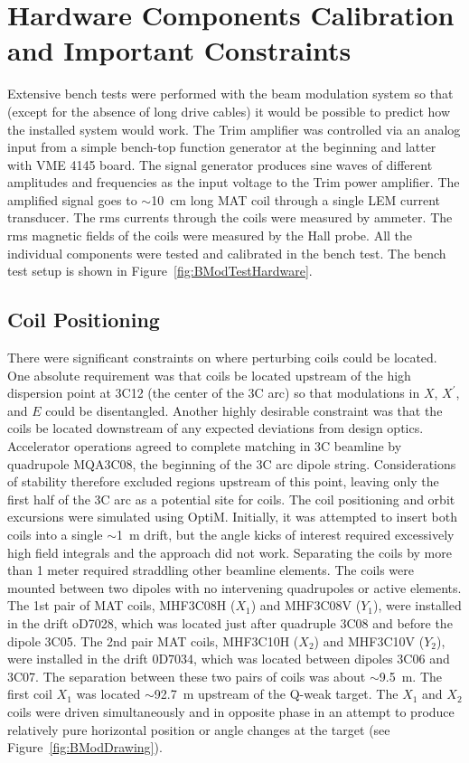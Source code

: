 \section{Hardware Components Calibration and Important Constraints}
\label{Hardware Components Calibration and Important Constraints}
Extensive bench tests were performed with the beam modulation system so that (except for the absence of long drive cables) it would be possible to predict how the installed system would work. The Trim amplifier was controlled via an analog input from a simple bench-top function generator at the beginning and latter with VME 4145 board. 
The signal generator produces sine waves of different amplitudes and frequencies as the input voltage to the Trim power amplifier. The amplified signal goes to $\sim$10~cm long MAT coil through a single LEM current transducer. The rms currents through the coils were measured by ammeter. The rms magnetic fields of the coils were measured by the Hall probe. All the individual components were tested and calibrated in the bench test. The bench test setup is shown in Figure~\ref{fig:BModTestHardware}.

\subsection{Coil Positioning}
\label{Coil Positioning}
There were significant constraints on where perturbing coils could be located. One absolute requirement was that coils be located upstream of the high dispersion point at 3C12 (the center of the 3C arc) so that modulations in $X$, $X^{\prime}$, and $E$ could be disentangled. Another highly desirable constraint was that the coils be located downstream of any expected deviations from design optics. Accelerator operations agreed to complete matching in 3C beamline by quadrupole MQA3C08, the beginning of the 3C arc dipole string. Considerations of stability therefore excluded regions upstream of this point, leaving only the first half of the 3C arc as a potential site for coils. 
The coil positioning and orbit excursions were simulated using OptiM. Initially, it was attempted to insert both coils into a single $\sim$1~m drift, but the angle kicks of interest required excessively high field integrals and the approach did not work. Separating the coils by more than 1 meter required straddling other beamline elements. The coils were mounted between two dipoles with no intervening quadrupoles or active elements. The 1st pair of MAT coils, MHF3C08H ($X_{1}$) and MHF3C08V ($Y_{1}$), were installed in the drift oD7028, which was located just after quadruple 3C08 and before the dipole 3C05. The 2nd pair MAT coils, MHF3C10H ($X_{2}$) and MHF3C10V ($Y_{2}$), were installed in the drift 0D7034, which was located between dipoles 3C06 and 3C07. The separation between these two pairs of coils was about $\sim$9.5~m. The first coil $X_{1}$ was located $\sim$92.7~m upstream of the Q-weak target.  %
The $X_{1}$ and $X_{2}$ coils were driven simultaneously and in opposite phase in an attempt to produce relatively pure horizontal position or angle changes at the target (see Figure~\ref{fig:BModDrawing}).

